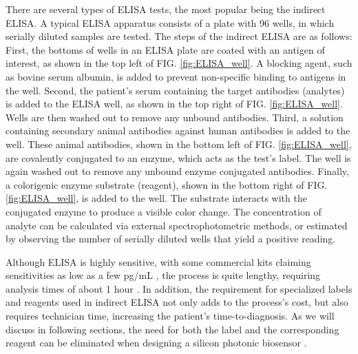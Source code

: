 \documentclass[aps,prl,twocolumn, superscriptaddress,nobalancelastpage]{revtex4}
\begin{document}
There are several types of ELISA tests, the most popular being the indirect ELISA. A typical ELISA apparatus consists of a plate with 96 wells, in which serially diluted samples are tested. The steps of the indirect ELISA are as follows: First, the bottoms of wells in an ELISA plate are coated with an antigen of interest, as shown in the top left of FIG. \ref{fig:ELISA_well}. A blocking agent, such as bovine serum albumin, is added to prevent non-specific binding to antigens in the well. Second, the patient's serum containing the target antibodies (analytes) is added to the ELISA well, as shown in the top right of FIG. \ref{fig:ELISA_well}. Wells are then washed out to remove any unbound antibodies. Third, a solution containing secondary animal antibodies against human antibodies is added to the well. These animal antibodies, shown in the bottom left of FIG. \ref{fig:ELISA_well}, are covalently conjugated to an enzyme, which acts as the test's label. The well is again washed out to remove any unbound enzyme conjugated antibodies. Finally, a colorigenic enzyme substrate (reagent), shown in the bottom right of FIG. \ref{fig:ELISA_well}, is added to the well. The substrate interacts with the conjugated enzyme to produce a visible color change. The concentration of analyte can be calculated via external spectrophotometric methods, or estimated by observing the number of serially diluted wells that yield a positive reading.

Although ELISA is highly sensitive, with some commercial kits claiming sensitivities as low as a few pg/mL \cite{ELISAlimit}, the process is quite lengthy, requiring analysis times of about 1 hour \cite{mechbiosensors}. In addition, the requirement for specialized labels and reagents used in indirect ELISA not only adds to the process's cost, but also requires technician time, increasing the patient's time-to-diagnosis. As we will discuss in following sections, the need for both the label and the corresponding reagent can be eliminated when designing a silicon photonic biosensor \cite{labelfree}.

\pagebreak
\end{document}
